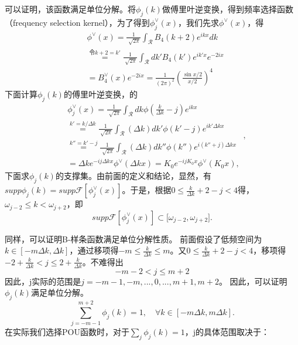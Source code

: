 可以证明，该函数满足单位分解。将$\phi_j(k)$做傅里叶逆变换，得到频率选择函数（frequency selection kernel），为了得到$\phi_{j}^{\vee}(x)$，我们先求$\phi^{\vee}(x)$，得
\begin{equation}
    \begin{aligned} 
        &\phi^{\vee}(x) =\frac{1}{\sqrt[]{2\pi } }\int_{\mathcal{R} }^{}  B_4(k+2)e^{ikx}dk \\
      &\overset{令k+2=k'}{=} \frac{1}{\sqrt[]{2\pi } }\int_{\mathcal{R} }^{}dk'B_4(k')e^{ik'x}e^{-2ix}\\
      &=B_4^{\vee } (x)e^{-2ix}=\frac{1}{(2\pi)^2}(\frac{\sin{x/2}}{x/2})^4
      \end{aligned}
\end{equation}
下面计算$\phi_j(k)$的傅里叶逆变换，的
\begin{equation}
    \begin{aligned} 
        & \phi_{j}^{\vee}(x)=\frac{1}{\sqrt[]{2\pi } }\int_{\mathcal{R} }^{}dk\phi(\frac{k}{\Delta k}-j )e^{ikx}  \\
       &\overset{k'=k/\Delta k}{=}\frac{1}{\sqrt[]{2\pi } }\int_{\mathcal{R} }^{}  (\Delta k)dk'\phi (k'-j)e^{ik'\Delta kx}  \\
       &\overset{k''=k'-j}{=}\frac{1}{\sqrt[]{2\pi } }\int_{\mathcal{R} }^{}  (\Delta k)dk''\phi (k'')e^{i(k''+j)\Delta kx}\\
       &=\Delta ke^{-ij\Delta kx}\phi^{\vee}(\Delta kx)=K_0e^{-ijK_{0}x}%
       \phi^{\vee}(K_{0}x),
       \end{aligned},
\end{equation}
下面求$\phi_{j}(k)$的支撑集。由前面的定义和结论，显然，有$supp\phi _j(k)=supp\mathcal{F}[\phi_{j}^{\vee}(x)]$。于是，根据$0\le \frac{k}{\Delta k}+2-j<4$得，$\omega_{j-2}\le k<\omega_{j+2}$，即
\begin{equation}
    supp\mathcal{F}[\phi_{j}^{\vee}(x)]\subset\lbrack\omega_{j-2}, \omega_{j+2}].
\end{equation}

同样，可以证明B-样条函数满足单位分解性质。
前面假设了低频空间为$k\in [-m\Delta k,\Delta k]$，通过移项得$-m\le \frac{k}{\Delta k}\le m$。又$0\le \frac{k}{\Delta k}+2-j<4$，移项得$-2+\frac{k}{\Delta k}<j\le 2+\frac{k}{\Delta k}$。不难得出
\begin{equation*}
    -m-2<j\le m+2
\end{equation*}
因此，j实际的范围是$j = -m-1,-m,...,0,...,m+1,m+2$。
因此，可以证明$\phi_{j}(k)$满足单位分解。
\begin{equation}\label{eq:sum1C4}
  \sum_{j=-m-1}^{m+2}\phi_j(k) = 1 ,\quad \forall k\in [-m\Delta k, m\Delta k].
\end{equation}
在实际我们选择POU函数时，对于$\sum_{j}^{}\phi_j(k) = 1$，j的具体范围取决于：

